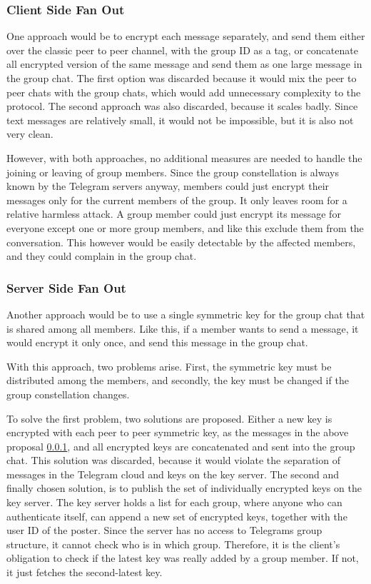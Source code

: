 \documentclass[a4paper, oneside]{discothesis}
\begin{document}
\subsubsection{Client Side Fan Out}
\label{sec:server_side_fan_out}

One approach would be to encrypt each message separately, and send them either over the classic peer to peer channel, with the group ID as a tag, or concatenate all encrypted version of the same message and send them as one large message in the group chat. The first option was discarded because it would mix the peer to peer chats with the group chats, which would add unnecessary complexity to the protocol. The second approach was also discarded, because it scales badly. Since text messages are relatively small, it would not be impossible, but it is also not very clean.

However, with both approaches, no additional measures are needed to handle the joining or leaving of group members. Since the group constellation is always known by the Telegram servers anyway, members could just encrypt their messages only for the current members of the group. It only leaves room for a relative harmless attack. A group member could just encrypt its message for everyone except one or more group members, and like this exclude them from the conversation. This however would be easily detectable by the affected members, and they could complain in the group chat. 

\subsubsection{Server Side Fan Out}

Another approach would be to use a single symmetric key for the group chat that is shared among all members. Like this, if a member wants to send a message, it would encrypt it only once, and send this message in the group chat.

With this approach, two problems arise. First, the symmetric key must be distributed among the members, and secondly, the key must be changed if the group constellation changes.

To solve the first problem, two solutions are proposed. Either a new key is encrypted with each peer to peer symmetric key, as the messages in the above proposal \ref{sec:server_side_fan_out}, and all encrypted keys are concatenated and sent into the group chat. This solution was discarded, because it would violate the separation of messages in the Telegram cloud and keys on the key server. The second and finally chosen solution, is to publish the set of individually encrypted keys on the key server. The key server holds a list for each group, where anyone who can authenticate itself, can append a new set of encrypted keys, together with the user ID of the poster. Since the server has no access to Telegrams group structure, it cannot check who is in which group. Therefore, it is the client's obligation to check if the latest key was really added by a group member. If not, it just fetches the second-latest key.
\end{document}
